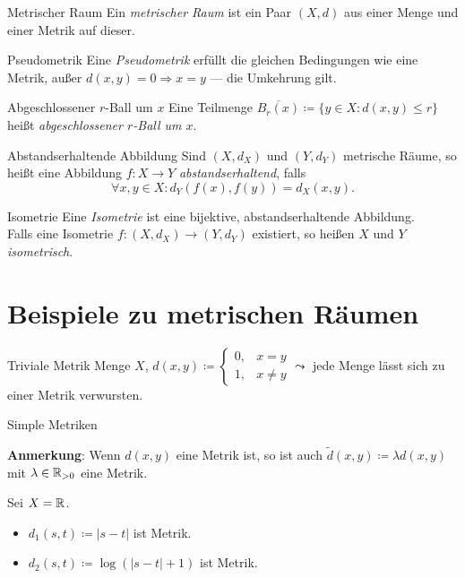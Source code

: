 \begin{definition}{Metrischer Raum}
  Ein \emph{metrischer Raum} ist ein Paar $ (X,d) $ aus einer Menge und einer Metrik auf dieser.
\end{definition}

\begin{definition}{Pseudometrik}
   Eine \emph{Pseudometrik} erfüllt die gleichen Bedingungen wie eine Metrik, außer $ d(x,y) = 0 \Rightarrow x = y $ --- die Umkehrung gilt.
\end{definition}

\begin{definition}{Abgeschlossener $ r $-Ball um $ x $}
  Eine Teilmenge $ \overline{B_r(x)} \coloneqq \{ y \in X : d(x,y) \leq r \} $ heißt \emph{abgeschlossener $ r $-Ball um $ x $}.
\end{definition}

\begin{definition}{Abstandserhaltende Abbildung}
  Sind $ (X, d_X) $ und $ (Y, d_Y) $ metrische Räume, so heißt eine Abbildung $ f: X \to Y $ \emph{abstandserhaltend}, falls
  \begin{equation*}
    \forall x, y \in X: d_Y(f(x), f(y)) = d_X(x, y)\text{.}
  \end{equation*}
\end{definition}

\begin{definition}{Isometrie}
  Eine \emph{Isometrie} ist eine bijektive, abstandserhaltende Abbildung. \\
  Falls eine Isometrie $ f: (X, d_X) \to (Y, d_Y) $ existiert, so heißen $ X $ und $ Y $ \emph{isometrisch}.
\end{definition}

\section{Beispiele zu metrischen Räumen}

\begin{example}{Triviale Metrik}
  Menge $ X $, $ d(x, y) \coloneqq \begin{cases}
    0, &x = y \\
    1, & x \neq y
  \end{cases} \leadsto $ jede Menge lässt sich zu einer Metrik verwursten. 
\end{example}

\begin{example}{Simple Metriken}
  \begin{marginfigure}
    \textbf{Anmerkung}: Wenn $ d(x, y) $ eine Metrik ist, so ist auch $ \widetilde{d}(x, y) \coloneqq \lambda d(x, y) $ mit $ \lambda \in \mathbb{R}_{>0} $ eine Metrik.
  \end{marginfigure}
  Sei $ X = \mathbb{R} $.
  \begin{itemize}
    \item $ d_1(s, t) \coloneqq |s-t| $ ist Metrik.
    \item $ d_2(s, t) \coloneqq \log(|s-t|+1) $ ist Metrik.
  \end{itemize}
\end{example}

